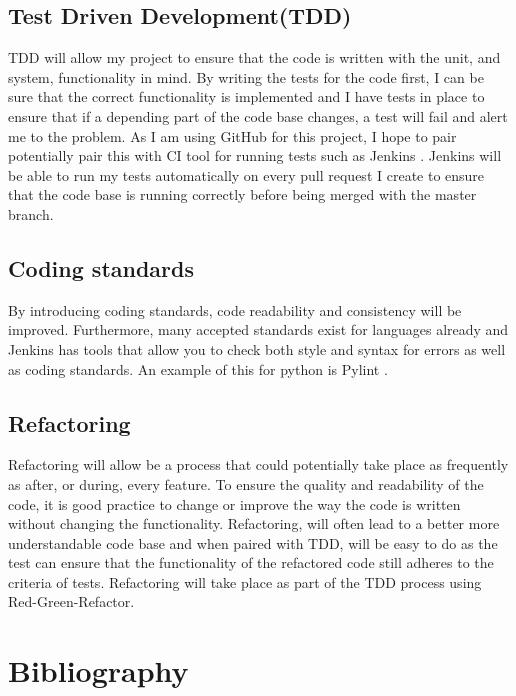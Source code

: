 \documentclass{article}
\begin{document}
\subsection{Test Driven Development(TDD)}
TDD will allow my project to ensure that the code is written with the unit, and system, functionality in mind. By writing the tests for the code first, I can be sure that the correct functionality is implemented and I have tests in place to ensure that if a depending part of the code base changes, a test will fail and alert me to the problem. As I am using GitHub for this project, I hope to pair potentially pair this with CI tool for running tests such as Jenkins \cite{jenkins}. Jenkins will be able to run my tests automatically on every pull request I create to ensure that the code base is running correctly before being merged with the master branch.

\subsection{Coding standards}
By introducing coding standards, code readability and consistency will be improved. Furthermore, many accepted standards exist for languages already and Jenkins has tools that allow you to check both style and syntax for errors as well as coding standards. An example of this for python is Pylint \cite{pylint}.

\subsection{Refactoring}
Refactoring will allow be a process that could potentially take place as frequently as after, or during, every feature. To ensure the quality and readability of the code, it is good practice to change or improve the way the code is written without changing the functionality. Refactoring, will often lead to a better more understandable code base and when paired with TDD, will be easy to do as the test can ensure that the functionality of the refactored code still adheres to the criteria of tests. Refactoring will take place as part of the TDD process using Red-Green-Refactor.


\nocite{*} %

\newpage


\section{Bibliography}
\end{document}
